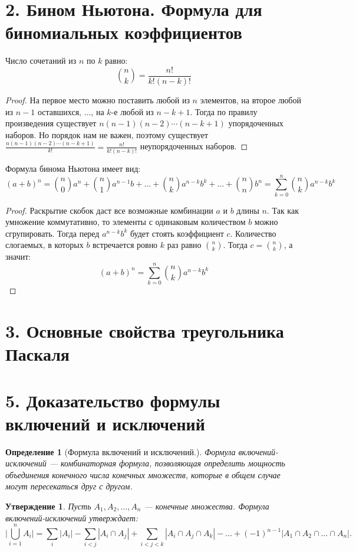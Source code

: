 \documentclass[a4paper,12pt]{article}
\newtheorem*{defin}{Определение}
\newtheorem*{state}{Утверждение}
\begin{document}
 	\section*{2. Бином Ньютона. Формула для биномиальных коэффициентов}
    Число сочетаний из $n$ по $k$ равно:
    \[
        \binom{n}{k} = \frac{n!}{k!(n - k)!}
    \]
    \begin{proof}
        На первое место можно поставить любой из $n$ элементов, на второе любой из $n - 1$ оставшихся, $\ldots$, на $k$-е любой из $n - k + 1$. Тогда по правилу произведения существует $n(n - 1)(n - 2)\cdots(n - k + 1)$ упорядоченных наборов. Но порядок нам не важен, поэтому существует $\displaystyle\frac{n(n - 1)(n - 2)\cdots(n - k + 1)}{k!} = \frac{n!}{k!(n - k)!}$ неупорядоченных наборов.
    \end{proof}
    Формула бинома Ньютона имеет вид:
    \[
        (a + b)^{n} = \binom{n}{0}a^{n} + \binom{n}{1}a^{n - 1}b + \ldots + \binom{n}{k}a^{n - k}b^{k} + \ldots + \binom{n}{n}b^{n} = \sum_{k = 0}^{n}\binom{n}{k}a^{n - k}b^{k}
    \]
    \begin{proof}
        Раскрытие скобок даст все возможные комбинации $a$ и $b$ длины $n$. Так как умножение коммутативно, то элементы с одинаковым количеством $b$ можно сгрупировать. Тогда перед $a^{n - k}b^{k}$ будет стоять коэффициент $c$. Количество слогаемых, в которых $b$ встречается ровно $k$ раз равно $\displaystyle\binom{n}{k}$. Тогда $c = \displaystyle\binom{n}{k}$, а значит:
        \[
            (a + b)^{n} = \sum_{k = 0}^{n}\binom{n}{k}a^{n - k}b^{k}
        \]
    \end{proof}
    \pagebreak %
	
	\section*{3. Основные свойства треугольника Паскаля}
	
	
 	\section*{5. Доказательство формулы включений и исключений}
 	\begin{defin} [Формула включений и исключений.] Формула включений-исключений — комбинаторная формула, позволяющая определить мощность объединения конечного числа конечных множеств, которые в общем случае могут пересекаться друг с другом.
 	\end{defin}
 	\begin{state}
		Пусть $ A_{1}, A_{2},\ldots , A_{n} $ — конечные множества. Формула включений-исключений утверждает:
		$$\biggl | \bigcup_{i=1}^{n}A_i \biggl | =
		 \sum_{i} | A_i | - \sum_{i<j} | A_i \cap A_j | + \sum_{i<j<k} | A_i \cap A_j \cap A_k | - \ldots + (-1)^{n-1} | A_1 \cap A_2 \cap \ldots \cap A_n |.$$
 	\end{state}
\end{document}

